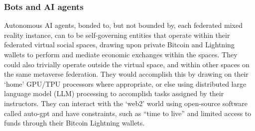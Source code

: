 \subsubsection{Bots and AI agents}
Autonomous AI agents, bonded to, but not bounded by, each federated mixed reality instance, can to be self-governing entities that operate within their federated virtual social spaces, drawing upon private Bitcoin and Lightning wallets to perform and mediate economic exchanges within the spaces. They could also trivially operate outside the virtual space, and within other spaces on the same metaverse federation. They would accomplish this by drawing on their `home' GPU/TPU processors where appropriate, or else using distributed large language model (LLM) processing to accomplish tasks assigned by their instructors. They can interact with the `web2' world using open-source software called auto-gpt and have constraints, such as ``time to live'' and limited access to funds through their Bitcoin Lightning wallets. 

